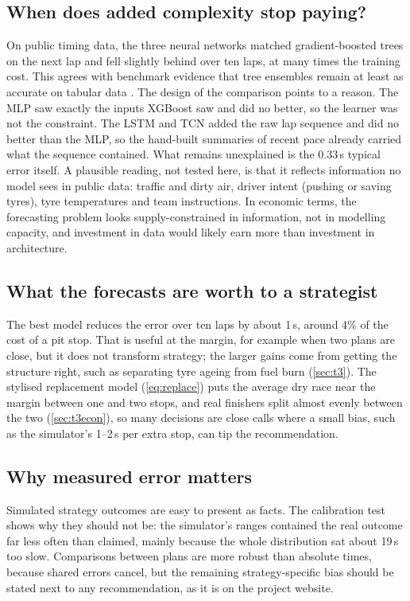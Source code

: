 \documentclass[12pt]{article}
\begin{document}
\subsection{When does added complexity stop paying?}
 On public timing data, the three neural networks matched
gradient-boosted trees on the next lap and fell slightly behind over ten laps, at many times the training cost. This
agrees with benchmark evidence that tree ensembles remain at least as accurate on tabular data
\parencite{grinsztajn2022,shwartzziv2022}. The design of the comparison points to a reason. The MLP saw exactly the
inputs XGBoost saw and did no better, so the learner was not the constraint. The LSTM and TCN added the raw lap
sequence and did no better than the MLP, so the hand-built summaries of recent pace already carried what the sequence
contained. What remains unexplained is the 0.33\,s typical error itself. A plausible reading, not tested here, is that
it reflects information no model sees in public data: traffic and dirty air, driver intent (pushing or saving tyres),
tyre temperatures and team instructions. In economic terms, the forecasting problem looks supply-constrained in
information, not in modelling capacity, and investment in data would likely earn more than investment in architecture.

\subsection{What the forecasts are worth to a strategist}
 The best model reduces the error over ten laps by about
1\,s, around 4\% of the cost of a pit stop. That is useful at the margin, for example when two plans are close, but it
does not transform strategy; the larger gains come from getting the structure right, such as separating tyre ageing
from fuel burn (\cref{sec:t3}). The stylised replacement model (\cref{eq:replace}) puts the average dry race near the margin between one
and two stops, and real finishers split almost evenly between the two (\cref{sec:t3econ}), so many decisions are close
calls where a small bias, such as the simulator's 1--2\,s per extra stop, can tip the recommendation.

\subsection{Why measured error matters}
 Simulated strategy outcomes are easy to present as facts. The calibration test
shows why they should not be: the simulator's ranges contained the real outcome far less often than claimed, mainly
because the whole distribution sat about 19\,s too slow. Comparisons between plans are more robust than absolute times,
because shared errors cancel, but the remaining strategy-specific bias should be stated next to any recommendation, as
it is on the project website.
\end{document}
